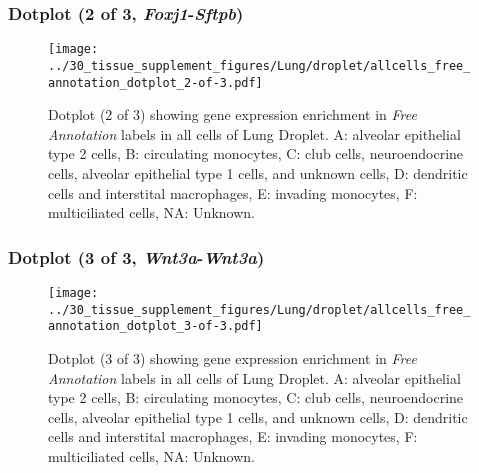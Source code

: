 \clearpage

\subsubsection{Dotplot (2 of 3, \emph{Foxj1}-\emph{Sftpb})}
\begin{figure}[h]
\centering
\texttt{[image: ../30\_tissue\_supplement\_figures/Lung/droplet/allcells\_free\_annotation\_dotplot\_2-of-3.pdf]}

\caption{ Dotplot (2 of 3)  showing gene expression enrichment in \emph{Free Annotation} labels in all cells of Lung Droplet. A: alveolar epithelial type 2 cells, B: circulating monocytes, C: club cells, neuroendocrine cells, alveolar epithelial type 1 cells, and unknown cells, D: dendritic cells and interstital macrophages, E: invading monocytes, F: multiciliated cells, NA: Unknown.}
\end{figure}


\clearpage

\subsubsection{Dotplot (3 of 3, \emph{Wnt3a}-\emph{Wnt3a})}
\begin{figure}[h]
\centering
\texttt{[image: ../30\_tissue\_supplement\_figures/Lung/droplet/allcells\_free\_annotation\_dotplot\_3-of-3.pdf]}

\caption{ Dotplot (3 of 3)  showing gene expression enrichment in \emph{Free Annotation} labels in all cells of Lung Droplet. A: alveolar epithelial type 2 cells, B: circulating monocytes, C: club cells, neuroendocrine cells, alveolar epithelial type 1 cells, and unknown cells, D: dendritic cells and interstital macrophages, E: invading monocytes, F: multiciliated cells, NA: Unknown.}
\end{figure}

